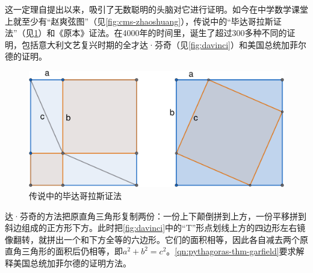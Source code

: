\documentclass[b5paper]{ctexart}
\begin{document}
这一定理自提出以来，吸引了无数聪明的头脑对它进行证明。如今在中学数学课堂上就至少有“赵爽弦图”（见\cref{fig:cms-zhaoshuang}），传说中的“毕达哥拉斯证法”（见\cref{fig:pythagoras-pww}）和《原本》证法。在4000年的时间里，诞生了超过300多种不同的证明，包括意大利文艺复兴时期的全才达·芬奇（见\cref{fig:davinci}）和美国总统加菲尔德的证明。

\begin{figure}[htbp]
 \centering
 \includegraphics[scale=0.25]{img/pythagoras-pww}
 \caption{传说中的毕达哥拉斯证法\label{fig:pythagoras-pww}}
\end{figure}

达·芬奇的方法把原直角三角形复制两份：一份上下颠倒拼到上方，一份平移拼到斜边组成的正方形下方。此时把\cref{fig:davinci}中的“T”形点划线上方的四边形左右镜像翻转，就拼出一个和下方全等的六边形。它们的面积相等，因此各自减去两个原直角三角形的面积后仍相等，即$a^2 + b^2 = c^2$。\cref{qn:pythagoras-thm-garfield}要求解释美国总统加菲尔德的证明方法。
\end{document}
